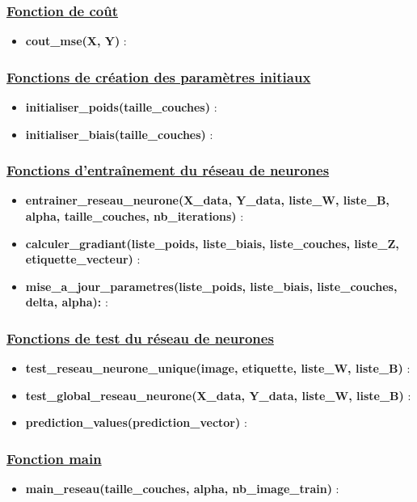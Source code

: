 \documentclass[12pt,a4paper]{article}
\begin{document}
\subsubsection{\underline{Fonction de coût}}

\begin{itemize}
    \item \textbf{cout\_mse(X, Y)} : 
\end{itemize}

\subsubsection{\underline{Fonctions de création des paramètres initiaux}}

\begin{itemize}
    \item \textbf{initialiser\_poids(taille\_couches)} : 
    \item \textbf{initialiser\_biais(taille\_couches)} : 
\end{itemize}

\subsubsection{\underline{Fonctions d’entraînement du réseau de neurones}}

\begin{itemize}
    \item \textbf{entrainer\_reseau\_neurone(X\_data, Y\_data, liste\_W, liste\_B, alpha, taille\_couches, nb\_iterations)} :
    \item \textbf{calculer\_gradiant(liste\_poids, liste\_biais, liste\_couches, liste\_Z, etiquette\_vecteur)} : 
    \item \textbf{mise\_a\_jour\_parametres(liste\_poids, liste\_biais, liste\_couches, delta, alpha):} : 
\end{itemize}

\subsubsection{\underline{Fonctions de test du réseau de neurones}}

\begin{itemize}
    \item \textbf{test\_reseau\_neurone\_unique(image, etiquette, liste\_W, liste\_B)} : 
    \item \textbf{test\_global\_reseau\_neurone(X\_data, Y\_data, liste\_W, liste\_B)} : 
    \item \textbf{prediction\_values(prediction\_vector)} : 
\end{itemize}

\subsubsection{\underline{Fonction main}}

\begin{itemize}
    \item \textbf{main\_reseau(taille\_couches, alpha, nb\_image\_train)} :
\end{itemize}
\end{document}
